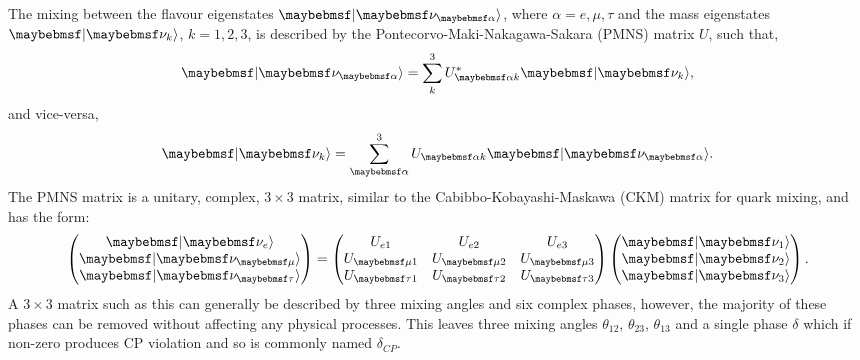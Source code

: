 The mixing between the flavour eigenstates $\ket{\nu_{\alpha}}$, where $\alpha=e,\mu,\tau$ and the
mass eigenstates $\ket{\nu_{k}}$, $k=1,2,3$, is described by the Pontecorvo-Maki-Nakagawa-Sakara
(PMNS) matrix $U$, such that,
\begin{equation} %
    \ket{\nu_{\alpha}}=\sum_{k}^{3}U_{\alpha k}^{*}\ket{\nu_{k}},
\end{equation} %
and vice-versa,
\begin{equation} %
    \ket{\nu_{k}}=\sum_{\alpha}^{3}U_{\alpha k}\ket{\nu_{\alpha}}.
\end{equation} %
The PMNS matrix is a unitary, complex, $3\times3$ matrix, similar to the Cabibbo-Kobayashi-Maskawa
(CKM) matrix for quark mixing, and has the form:
\begin{gather} %
    \begin{pmatrix}
        \ket{\nu_{e}}   \\
        \ket{\nu_{\mu}} \\
        \ket{\nu_{\tau}}
    \end{pmatrix}
    =
    \begin{pmatrix}
        U_{e1}     & U_{e2}     & U_{e3}     \\
        U_{\mu 1}  & U_{\mu 2}  & U_{\mu 3}  \\
        U_{\tau 1} & U_{\tau 2} & U_{\tau 3}
    \end{pmatrix}
    \begin{pmatrix}
        \ket{\nu_{1}} \\
        \ket{\nu_{2}} \\
        \ket{\nu_{3}}
    \end{pmatrix}.
\end{gather} %
A $3\times3$ matrix such as this can generally be described by three mixing angles and six complex
phases, however, the majority of these phases can be removed without affecting any physical
processes. This leaves three mixing angles $\theta_{12}$, $\theta_{23}$, $\theta_{13}$ and a
single phase $\delta$ which if non-zero produces CP violation and so is commonly named
$\delta_{CP}$.

